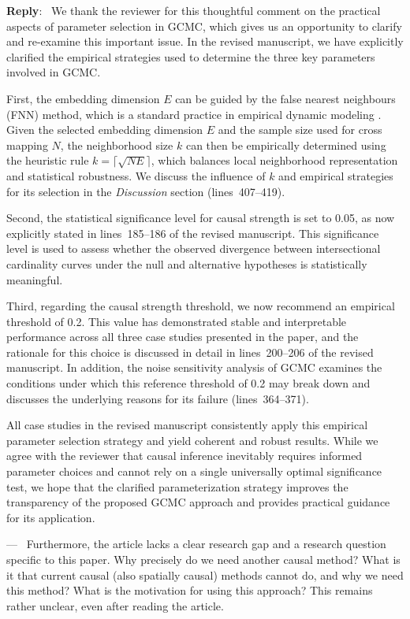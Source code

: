 \documentclass[11pt]{article}
\newcounter{reviewer}
\newcounter{point}[reviewer]
\renewcommand{\thepoint}{Comment\,\thereviewer.\arabic{point}}
\newenvironment{point}
   {\refstepcounter{point} \bigskip \noindent {\textbf{Reviewer~\thepoint} } ---\ }
   {\par }
\newenvironment{reply}
   {\medskip \noindent \color{blue} \begin{sf}\textbf{Reply}:\  }
   {\medskip \par \end{sf}}
\begin{document}
\begin{reply}
We thank the reviewer for this thoughtful comment on the practical aspects of parameter selection in GCMC, which gives us an opportunity to clarify and re-examine this important issue. In the revised manuscript, we have explicitly clarified the empirical strategies used to determine the three key parameters involved in GCMC.

First, the embedding dimension \(E\) can be guided by the false nearest neighbours (FNN) method, which is a standard practice in empirical dynamic modeling \citep{kennel1992fnn}. Given the selected embedding dimension \(E\) and the sample size used for cross mapping \(N\), the neighborhood size \(k\) can then be empirically determined using the heuristic rule \(k = \lceil \sqrt{N E} \rceil\), which balances local neighborhood representation and statistical robustness. We discuss the influence of \(k\) and empirical strategies for its selection in the \textit{Discussion} section (lines~407--419).

Second, the statistical significance level for causal strength is set to 0.05, as now explicitly stated in lines~185--186 of the revised manuscript. This significance level is used to assess whether the observed divergence between intersectional cardinality curves under the null and alternative hypotheses is statistically meaningful.

Third, regarding the causal strength threshold, we now recommend an empirical threshold of 0.2. This value has demonstrated stable and interpretable performance across all three case studies presented in the paper, and the rationale for this choice is discussed in detail in lines~200--206 of the revised manuscript. In addition, the noise sensitivity analysis of GCMC examines the conditions under which this reference threshold of 0.2 may break down and discusses the underlying reasons for its failure (lines~364--371).

All case studies in the revised manuscript consistently apply this empirical parameter selection strategy and yield coherent and robust results. While we agree with the reviewer that causal inference inevitably requires informed parameter choices and cannot rely on a single universally optimal significance test, we hope that the clarified parameterization strategy improves the transparency of the proposed GCMC approach and provides practical guidance for its application.
\end{reply}

\begin{point}
Furthermore, the article lacks a clear research gap and a research question specific to this paper. Why precisely do we need another causal method? What is it that current causal (also spatially causal) methods cannot do, and why we need this method? What is the motivation for using this approach? This remains rather unclear, even after reading the article.
\end{point}
\end{document}
